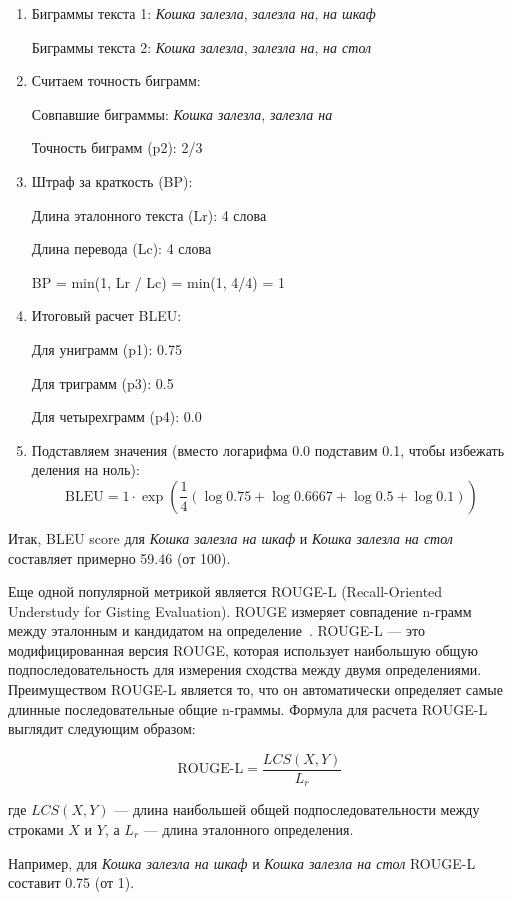 \documentclass[LI,VKR]{HSEUniversity}
\begin{document}
\begin{enumerate}
    \item Биграммы текста 1: \textit{Кошка залезла}, \textit{залезла на}, \textit{на шкаф}

Биграммы текста 2: \textit{Кошка залезла}, \textit{залезла на}, \textit{на стол}
    \item Считаем точность биграмм:

Совпавшие биграммы: \textit{Кошка залезла}, \textit{залезла на}

Точность биграмм (p2): 2/3
    \item Штраф за краткость (BP):

Длина эталонного текста (Lr): 4 слова

Длина перевода (Lc): 4 слова

BP = min(1, Lr / Lc) = min(1, 4/4) = 1
    \item Итоговый расчет BLEU:

Для униграмм (p1): 0.75

Для триграмм (p3): 0.5

Для четырехграмм (p4): 0.0
    \item Подставляем значения (вместо логарифма 0.0 подставим 0.1, чтобы избежать деления на ноль):
\[
\text{BLEU} = 1 \cdot \exp \left( \frac{1}{4} (\log 0.75 + \log 0.6667 + \log 0.5 + \log 0.1) \right)
\]
\end{enumerate}

Итак, BLEU score для \textit{Кошка залезла на шкаф} и \textit{Кошка залезла на стол} составляет примерно 59.46 (от 100).

Еще одной популярной метрикой является ROUGE-L (Recall-Oriented Understudy for Gisting Evaluation).
ROUGE измеряет совпадение n-грамм между эталонным и кандидатом на определение~\cite{ROUGE}.
ROUGE-L — это модифицированная версия ROUGE, которая использует наибольшую общую подпоследовательность
для измерения сходства между двумя определениями.
Преимуществом ROUGE-L является то, что он автоматически определяет самые длинные последовательные общие n-граммы.
Формула для расчета ROUGE-L выглядит следующим образом:

\begin{equation}
\text{ROUGE-L} = \frac{LCS(X, Y)}{L_r}
\end{equation}

где $LCS(X, Y)$ — длина наибольшей общей подпоследовательности между строками $X$ и $Y$, а $L_r$ — длина эталонного определения.

Например, для \textit{Кошка залезла на шкаф} и \textit{Кошка залезла на стол} ROUGE-L составит 0.75 (от 1).
\end{document}
